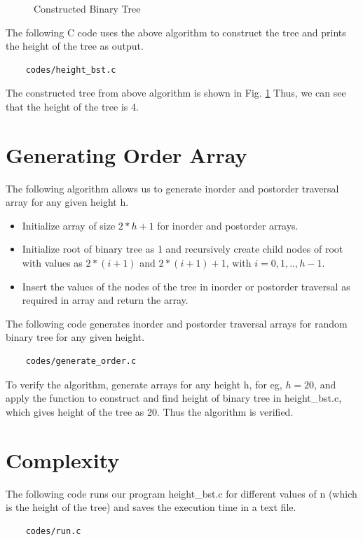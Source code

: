 \documentclass[journal,12pt,twocolumn]{IEEEtran}
\begin{document}
\begin{figure}[!ht]
\centering

\caption{Constructed Binary Tree}
\label{fig:bst}
\end{figure}
The following C code uses the above algorithm to construct the tree and prints the height of the tree as output. 
\begin{lstlisting}
    codes/height_bst.c
\end{lstlisting}
The constructed tree from above algorithm is shown in Fig. \ref{fig:bst}
\newline
Thus, we can see that the height of the tree is 4.

\section{Generating Order Array}
The following algorithm allows us to generate inorder and postorder traversal array for any given height h.
\begin{itemize}
    \item Initialize array of size $2*h + 1$ for inorder and postorder arrays.
    \item Initialize root of binary tree as 1 and recursively create child nodes of root with values as $2*(i+1)$ and $2*(i+1)+1$, with $i=0,1,..,h-1$.
    \item Insert the values of the nodes of the tree in inorder or postorder traversal as required in array and return the array.
\end{itemize}

The following code generates inorder and postorder traversal arrays for random binary tree for any given height.
\begin{lstlisting}
    codes/generate_order.c
\end{lstlisting}

To verify the algorithm, generate arrays for any height h, for eg, $h = 20$, and apply the function to construct and find height of binary tree in height\_bst.c, which gives height of the tree as 20.
Thus the algorithm is verified.

\section{Complexity}
The following code runs our program height\_bst.c for different values of n (which is the height of the tree) and saves the execution time in a text file. 
\begin{lstlisting}
    codes/run.c
\end{lstlisting}
\end{document}
